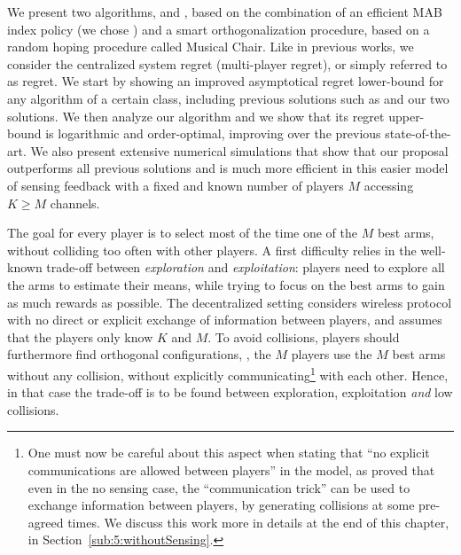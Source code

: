 We present two algorithms, \RandTopM{} and \MCTopM, based on the combination of an efficient MAB index policy (we chose \klUCB) and a smart orthogonalization procedure, based on a random hoping procedure called Musical Chair.
Like in previous works, we consider the centralized system regret (multi-player regret), or simply referred to as regret.
We start by showing an improved asymptotical regret lower-bound for any algorithm of a certain class, including previous solutions such as \rhoRand{} and our two solutions.
We then analyze our \MCTopM{} algorithm and we show that its regret upper-bound is logarithmic and order-optimal, improving over the previous state-of-the-art.
We also present extensive numerical simulations that show that our proposal outperforms all previous solutions and is much more efficient in this easier model of sensing feedback with a fixed and known number of players $M$ accessing $K \geq M$ channels.


The goal for every player is to select most of the time one of the $M$ best arms, without colliding too often with other players.
A first difficulty relies in the well-known trade-off between \emph{exploration} and \emph{exploitation}: players need to explore all the arms to estimate their means, while trying to focus on the best arms to gain as much rewards as possible.
The decentralized setting considers wireless protocol with no direct or explicit exchange of information between players, and assumes that the players only know $K$ and $M$. To avoid collisions, players should furthermore find orthogonal configurations, \ie, the $M$ players use the $M$ best arms without any collision, without explicitly communicating\footnote{One must now be careful about this aspect when stating that ``no explicit communications are allowed between players'' in the model, as \cite{BoursierPerchet18} proved that even in the no sensing case, the ``communication trick'' can be used to exchange information between players, by generating collisions at some pre-agreed times. We discuss this work more in details at the end of this chapter, in Section~\ref{sub:5:withoutSensing}.} with each other.
Hence, in that case the trade-off is to be found between exploration, exploitation \emph{and} low collisions.

